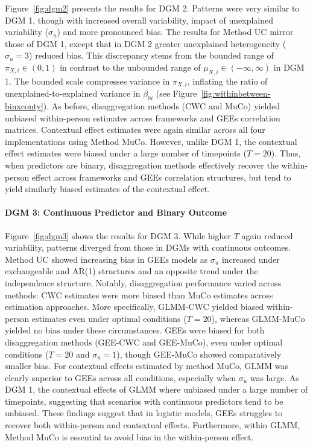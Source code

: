 \documentclass[stu]{apa7}
\begin{document}
Figure~\ref{fig:dgm2} presents the results for DGM 2. Patterns were very similar to DGM 1, though with increased overall variability, impact of unexplained variability ($\sigma_u$) and more pronounced bias. The results for Method UC mirror those of DGM 1, except that in DGM 2 greater unexplained heterogeneity (\(\sigma_u = 3\)) reduced bias. This discrepancy stems from the bounded range of $\pi_{X,i} \in (0,1)$ in contrast to the unbounded range of $\mu_{X,i} \in (-\infty, \infty)$ in DGM 1. The bounded scale compresses variance in $\pi_{X,i}$, inflating the ratio of unexplained-to-explained variance in $\beta_{0i}$ (see Figure~\ref{fig:withinbetween-binxconty}). As before, disaggregation methods (CWC and MuCo) yielded unbiased within-person estimates across frameworks and GEEs correlation matrices. Contextual effect estimates were again similar across all four implementations using Method MuCo. However, unlike DGM 1, the contextual effect estimates were biased under a large number of timepoints ($T = 20$). Thus, when predictors are binary, disaggregation methods effectively recover the within-person effect across frameworks and GEEs correlation structures, but tend to yield similarly biased estimates of the contextual effect.



\newpage



\paragraph{DGM 3: Continuous Predictor and Binary Outcome}

Figure~\ref{fig:dgm3} shows the results for DGM 3. While higher \(T\) again reduced variability, patterns diverged from those in DGMs with continuous outcomes. Method UC showed increasing bias in GEEs models as \(\sigma_u\) increased under exchangeable and AR(1) structures and an opposite trend under the independence structure. Notably, disaggregation performance varied across methods: CWC estimates were more biased than MuCo estimates across estimation approaches. More specifically, GLMM-CWC yielded biased within-person estimates even under optimal conditions ($T = 20$), whereas GLMM-MuCo yielded no bias under these circumstances. GEEs were biased for both disaggregation methods (GEE-CWC and GEE-MuCo), even under optimal conditions ($T = 20$ and $\sigma_u = 1$), though GEE-MuCo showed comparatively smaller bias. For contextual effects estimated by method MuCo, GLMM was clearly superior to GEEs across all conditions, especially when \(\sigma_u \) was large. As DGM 1, the contextual effects of GLMM where unbiased under a large number of timepoints, suggesting that scenarios with continuous predictors tend to be unbiased. These findings suggest that in logistic models, GEEs struggles to recover both within-person and contextual effects. Furthermore, within GLMM, Method MuCo is essential to avoid bias in the within-person effect.
\end{document}
